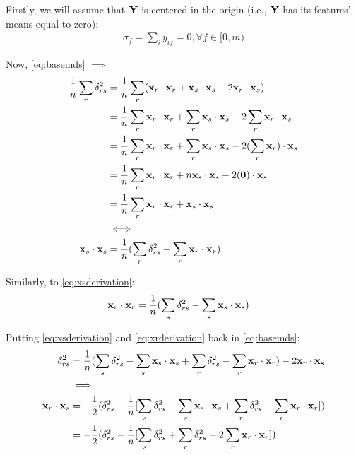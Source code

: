 Firstly, we will assume that $\mathbf{Y}$ is centered in the origin (i.e., $\mathbf{Y}$ has its features' means equal to zero):
\begin{align}
	\label{eq:mds_zeromean}
	\sigma_f = \sum_i y_{if} = 0, \forall f\in [0, m)
\end{align}

Now, \ref{eq:basemds} $\implies$
\begin{align}
\label{eq:xsderivation}
\begin{split}
\frac{1}{n} \sum_r \delta_{rs}^2
&= \frac{1}{n} \sum_r (\mathbf{x}_r \cdot \mathbf{x}_r + \mathbf{x}_s\cdot \mathbf{x}_s -2 \mathbf{x}_r\cdot \mathbf{x}_s) \\
&= \frac{1}{n} \sum_r \mathbf{x}_r\cdot \mathbf{x}_r + \sum_r \mathbf{x}_s\cdot \mathbf{x}_s -2 \sum_r \mathbf{x}_r \cdot \mathbf{x}_s \\
&= \frac{1}{n} \sum_r \mathbf{x}_r\cdot \mathbf{x}_r + \sum_r \mathbf{x}_s\cdot \mathbf{x}_s -2 (\sum_r \mathbf{x}_r) \cdot \mathbf{x}_s \\
&= \frac{1}{n} \sum_r \mathbf{x}_r\cdot \mathbf{x}_r + n \mathbf{x}_s\cdot \mathbf{x}_s -2 (\mathbf{0}) \cdot \mathbf{x}_s \\
&= \frac{1}{n} \sum_r \mathbf{x}_r\cdot \mathbf{x}_r + \mathbf{x}_s\cdot \mathbf{x}_s \\
&\iff \\
\mathbf{x}_s\cdot \mathbf{x}_s &= \frac{1}{n} (\sum_r \delta_{rs}^2 - \sum_r \mathbf{x}_r \cdot \mathbf{x}_r)
\end{split}
\end{align}

Similarly, to \ref{eq:xsderivation}:
\begin{align}
\label{eq:xrderivation}
\begin{split}
\mathbf{x}_r\cdot \mathbf{x}_r &= \frac{1}{n} (\sum_s \delta_{rs}^2 - \sum_s \mathbf{x}_s \cdot \mathbf{x}_s)
\end{split}
\end{align}

Putting \ref{eq:xsderivation} and \ref{eq:xrderivation} back in \ref{eq:basemds}:
\begin{align}
\label{eq:xrsderivation}
\begin{split}
\delta_{rs}^2 &= \frac{1}{n} (\sum_s \delta_{rs}^2 - \sum_s \mathbf{x}_s \cdot \mathbf{x}_s + \sum_r \delta_{rs}^2 - \sum_r \mathbf{x}_r \cdot \mathbf{x}_r) -2 \mathbf{x}_r \cdot \mathbf{x}_s \\
&\implies \\
\mathbf{x}_r\cdot \mathbf{x}_s &= -\frac{1}{2} (\delta_{rs}^2 - \frac{1}{n} [\sum_s \delta_{rs}^2 - \sum_s \mathbf{x}_s \cdot \mathbf{x}_s + \sum_r \delta_{rs}^2 - \sum_r \mathbf{x}_r \cdot \mathbf{x}_r])\\
&= -\frac{1}{2} (\delta_{rs}^2 - \frac{1}{n} [\sum_s \delta_{rs}^2 + \sum_r \delta_{rs}^2 - 2\sum_r \mathbf{x}_r \cdot \mathbf{x}_r])\\
\end{split}
\end{align}

